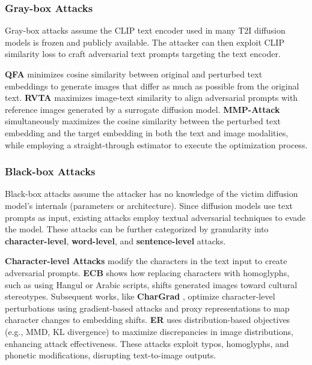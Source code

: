 \subsubsection{Gray-box Attacks}
\label{subsubsec:Similarity-based optimization}
Gray-box attacks assume the CLIP text encoder used in many T2I diffusion models is frozen and publicly available. The attacker can then exploit CLIP similarity loss to craft adversarial text prompts targeting the text encoder.


\textbf{QFA} \cite{zhuang2023pilot} minimizes cosine similarity between original and perturbed text embeddings to generate images that differ as much as possible from the original text. \textbf{RVTA} \cite{zhang2024revealing} maximizes image-text similarity to align adversarial prompts with reference images generated by a surrogate diffusion model. 
\textbf{MMP-Attack}~\cite{yang2024multi} simultaneously maximizes the cosine similarity between the perturbed text embedding and the target embedding in both the text and image modalities, while employing a straight-through estimator to execute the optimization process.



\subsubsection{Black-box Attacks}
Black-box attacks assume the attacker has no knowledge of the victim diffusion model's internals (parameters or architecture). Since diffusion models use text prompts as input, existing attacks employ textual adversarial techniques to evade the model. These attacks can be further categorized by granularity into \textbf{character-level}, \textbf{word-level}, and \textbf{sentence-level} attacks.

\textbf{Character-level Attacks} modify the characters in the text input to create adversarial prompts. \textbf{ECB} \cite{struppek2023exploiting} shows how replacing characters with homoglyphs, such as using Hangul or Arabic scripts, shifts generated images toward cultural stereotypes. Subsequent works, like \textbf{CharGrad} \cite{kou2023character}, optimize character-level perturbations using gradient-based attacks and proxy representations to map character changes to embedding shifts. \textbf{ER} \cite{gao2023evaluating} uses distribution-based objectives (e.g., MMD, KL divergence) to maximize discrepancies in image distributions, enhancing attack effectiveness. These attacks exploit typos, homoglyphs, and phonetic modifications, disrupting text-to-image outputs.


